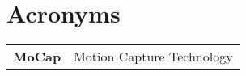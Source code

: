 \section*{\Huge Acronyms}



\begin{table}[H]
    \begin{tabular}{c c}
        \textbf{MoCap} & Motion Capture Technology \\
    \end{tabular}
\end{table}